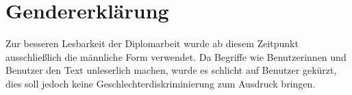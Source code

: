 \section{Gendererklärung}
Zur besseren Lesbarkeit der Diplomarbeit wurde ab diesem Zeitpunkt ausschließlich die männliche Form verwendet. Da Begriffe wie \glqq{}Benutzerinnen und Benutzer\grqq{} den Text unleserlich machen, wurde es schlicht auf \glqq{}Benutzer\grqq{} gekürzt, dies soll jedoch keine Geschlechterdiskriminierung zum Ausdruck bringen.